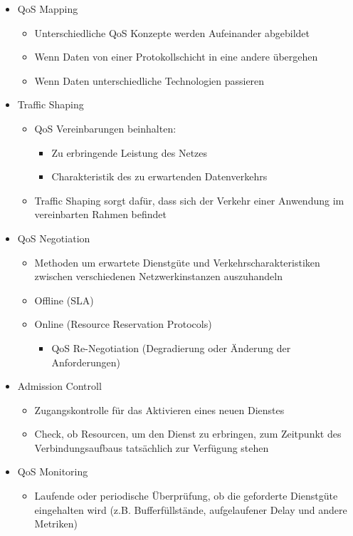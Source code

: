 \begin{itemize}
\item QoS Mapping
\begin{itemize}
\item Unterschiedliche QoS Konzepte werden Aufeinander abgebildet
\item Wenn Daten von einer Protokollschicht in eine andere übergehen
\item Wenn Daten unterschiedliche Technologien passieren
\end{itemize}
\item Traffic Shaping
\begin{itemize}
\item QoS Vereinbarungen beinhalten: 
\begin{itemize}
\item Zu erbringende Leistung des Netzes
\item Charakteristik des zu erwartenden Datenverkehrs
\end{itemize}
\item Traffic Shaping sorgt dafür, dass sich der Verkehr einer Anwendung im vereinbarten Rahmen befindet
\end{itemize}
\item QoS Negotiation
\begin{itemize}
\item Methoden um erwartete Dienstgüte und Verkehrscharakteristiken zwischen verschiedenen Netzwerkinstanzen auszuhandeln
\item Offline (SLA)
\item Online (Resource Reservation Protocols)
\begin{itemize}
\item QoS Re-Negotiation (Degradierung oder Änderung der Anforderungen)
\end{itemize}
\end{itemize}
\item Admission Controll
\begin{itemize}
\item Zugangskontrolle für das Aktivieren eines neuen Dienstes
\item Check, ob Resourcen, um den Dienst zu erbringen, zum Zeitpunkt des Verbindungsaufbaus tatsächlich zur Verfügung stehen
\end{itemize}
\item QoS Monitoring
\begin{itemize}
\item Laufende oder periodische Überprüfung, ob die geforderte Dienstgüte eingehalten wird (z.B. Bufferfüllstände, aufgelaufener Delay und andere Metriken)

\end{itemize}
\end{itemize}
